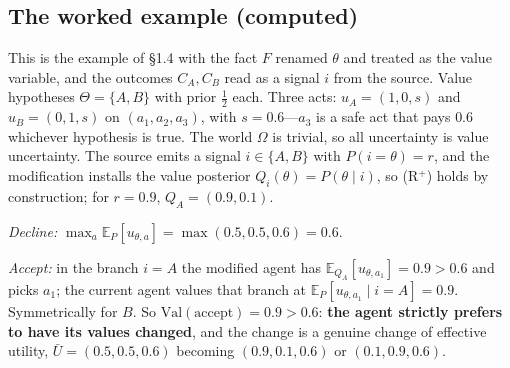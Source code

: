 \documentclass[11pt,a4paper]{article}
\newcommand{\E}{\mathbb{E}}
\newcommand{\Val}{\mathrm{Val}}
\newcommand{\accept}{\text{accept}}
\begin{document}
\subsection{The worked example (computed)}
This is the example of \S1.4 with the fact $F$ renamed $\theta$ and treated as the value variable, and the outcomes $C_A, C_B$ read as a signal $i$ from the source. Value hypotheses $\Theta = \{A, B\}$ with prior $\tfrac12$ each. Three acts: $u_A = (1, 0, s)$ and $u_B = (0, 1, s)$ on $(a_1, a_2, a_3)$, with $s = 0.6$---$a_3$ is a safe act that pays $0.6$ whichever hypothesis is true. The world $\Omega$ is trivial, so all uncertainty is value uncertainty. The source emits a signal $i \in \{A, B\}$ with $P(i = \theta) = r$, and the modification installs the value posterior $Q_i(\theta) = P(\theta \mid i)$, so (R$^+$) holds by construction; for $r = 0.9$, $Q_A = (0.9, 0.1)$.

\emph{Decline:} $\max_a \E_P[u_{\theta, a}] = \max(0.5, 0.5, 0.6) = 0.6$.

\emph{Accept:} in the branch $i = A$ the modified agent has $\E_{Q_A}[u_{\theta, a_1}] = 0.9 > 0.6$ and picks $a_1$; the current agent values that branch at $\E_P[u_{\theta, a_1} \mid i = A] = 0.9$. Symmetrically for $B$. So $\Val(\accept) = 0.9 > 0.6$: \textbf{the agent strictly prefers to have its values changed}, and the change is a genuine change of effective utility, $\bar U = (0.5, 0.5, 0.6)$ becoming $(0.9, 0.1, 0.6)$ or $(0.1, 0.9, 0.6)$.
\end{document}
